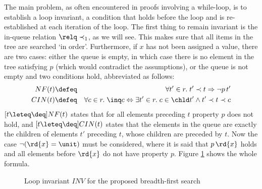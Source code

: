 The main problem, as often encountered in proofs involving a while-loop, is to
establish a loop invariant, \IE a condition that holds before the loop
and is re-established at each iteration of the loop. 
The first thing to remain invariant is the in-queue relation $\relq \prec_1$, as we will
see. This makes sure that all items in the tree are searched `in
order'. Furthermore, if $x$ has not been assigned a value, there are two
cases: either the queue is empty, in which case there is no element in the
tree satisfying $p$ (which would contradict the  assumptions), or the queue is not
empty and two conditions hold, abbreviated as follows:
\begin{eqnarray}
\label{eq:def-nf}
NF(t) &\defeq& \forall t'\in r.\; t' \prec t \Rightarrow \lnot p\, t' \\
\label{eq:def-cin}
CIN(t) &\defeq& \forall c\in r.\; \inq c \Leftrightarrow \exists t' \in r.\; c\in \chld t' \land t' \prec t \prec c
\end{eqnarray}
$[t \leteq \deq]NF(t)$ states that for all elements preceding $t$ property $p$ does
not hold, and $[t\leteq \deq]CIN(t)$ states that the elements in the queue are
exactly the children of elements $t'$  preceding $t$, whose children are
preceded by $t$. Now the case $\lnot (\rd{x}=\unit)$ must be considered, where it is said
that $p\, \rd{x}$ holds and all elements before $\rd{x}$ do not have property
$p$. Figure \ref{fig:inv} shows the whole formula.

\begin{figure}
\begin{center}
\end{center}
\caption[A loop invariant]{Loop invariant $INV$ for the proposed breadth-first search}
\label{fig:inv}
\end{figure}

